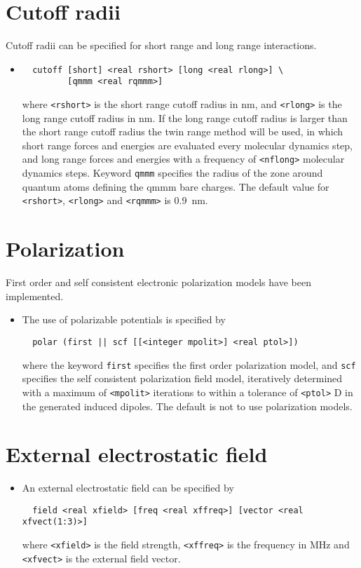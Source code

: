 \section{Cutoff radii}
Cutoff radii can be specified for short range and long range interactions.
\begin{itemize}
\item
\begin{verbatim}
  cutoff [short] <real rshort> [long <real rlong>] \
         [qmmm <real rqmmm>]
\end{verbatim}
where \verb+<rshort>+ is the short range cutoff radius in nm, and \verb+<rlong>+
is the long range cutoff radius in nm. If the long range cutoff radius
is larger than the short range cutoff radius the twin range method will
be used, in which short range forces and energies are evaluated every
molecular dynamics step, and long range forces and energies with a
frequency of \verb+<nflong>+ molecular dynamics steps. Keyword
\verb+qmmm+ specifies the radius of the zone around quantum atoms
defining the qmmm bare charges.
The default value for \verb+<rshort>+, \verb+<rlong>+ and \verb+<rqmmm>+ is 0.9~nm.
\end{itemize}

\section{Polarization}
First order and self consistent electronic polarization models have
been implemented.
\begin{itemize}
\item
The use of polarizable potentials is specified by
\begin{verbatim}
  polar (first || scf [[<integer mpolit>] <real ptol>])
\end{verbatim}
where the keyword {\tt first} specifies the first order polarization
model, and {\tt scf} specifies the self consistent polarization field
model, iteratively determined with a maximum of \verb+<mpolit>+
iterations to within a tolerance of \verb+<ptol>+ D in the generated
induced dipoles. The default is not to use polarization models.
\end{itemize}

\section{External electrostatic field}
\begin{itemize}
\item
An external electrostatic field can be specified by
\begin{verbatim}
  field <real xfield> [freq <real xffreq>] [vector <real xfvect(1:3)>]
\end{verbatim}
where \verb+<xfield>+ is the field strength, \verb+<xffreq>+ is the
frequency in MHz and \verb+<xfvect>+ is the external field vector.
\end{itemize}

